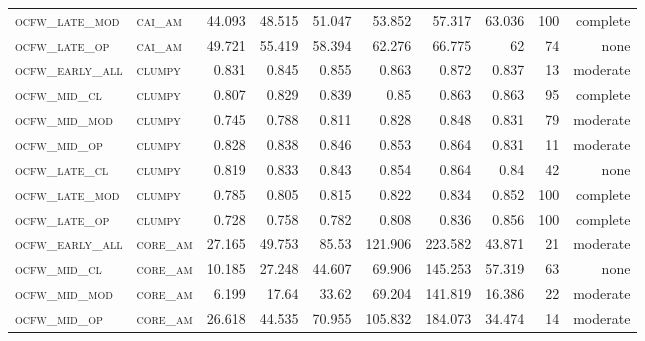 \begin{landscape}
\begin{center}
\begin{footnotesize}
\begin{longtable}{llrrrrr|rrr}
\textsc{ocfw\_late\_mod } & \textsc{cai\_am   }    & 44.093   & 48.515   & 51.047   & 53.852   & 57.317     & 63.036        & 100           & complete             \\
\textsc{ocfw\_late\_op  } & \textsc{cai\_am   }    & 49.721   & 55.419   & 58.394   & 62.276   & 66.775     & 62            & 74            & none        \\
\textsc{ocfw\_early\_all} & \textsc{clumpy    }    & 0.831    & 0.845    & 0.855    & 0.863    & 0.872      & 0.837         & 13            & moderate        \\
\textsc{ocfw\_mid\_cl   } & \textsc{clumpy    }    & 0.807    & 0.829    & 0.839    & 0.85     & 0.863      & 0.863         & 95            & complete        \\
\textsc{ocfw\_mid\_mod  } & \textsc{clumpy    }    & 0.745    & 0.788    & 0.811    & 0.828    & 0.848      & 0.831         & 79            & moderate        \\
\textsc{ocfw\_mid\_op   } & \textsc{clumpy    }    & 0.828    & 0.838    & 0.846    & 0.853    & 0.864      & 0.831         & 11            & moderate        \\
\textsc{ocfw\_late\_cl  } & \textsc{clumpy    }    & 0.819    & 0.833    & 0.843    & 0.854    & 0.864      & 0.84          & 42            & none        \\
\textsc{ocfw\_late\_mod } & \textsc{clumpy    }    & 0.785    & 0.805    & 0.815    & 0.822    & 0.834      & 0.852         & 100           & complete             \\
\textsc{ocfw\_late\_op  } & \textsc{clumpy    }    & 0.728    & 0.758    & 0.782    & 0.808    & 0.836      & 0.856         & 100           & complete             \\
\textsc{ocfw\_early\_all} & \textsc{core\_am  }    & 27.165   & 49.753   & 85.53    & 121.906  & 223.582    & 43.871        & 21            & moderate        \\
\textsc{ocfw\_mid\_cl   } & \textsc{core\_am  }    & 10.185   & 27.248   & 44.607   & 69.906   & 145.253    & 57.319        & 63            & none        \\
\textsc{ocfw\_mid\_mod  } & \textsc{core\_am  }    & 6.199    & 17.64    & 33.62    & 69.204   & 141.819    & 16.386        & 22            & moderate        \\
\textsc{ocfw\_mid\_op   } & \textsc{core\_am  }    & 26.618   & 44.535   & 70.955   & 105.832  & 184.073    & 34.474        & 14            & moderate        \\

\end{longtable}
\end{footnotesize}
\end{center}
\end{landscape}
